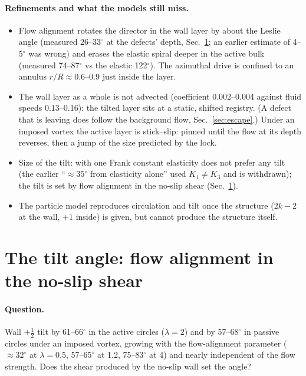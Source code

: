 \documentclass[11pt,a4paper]{article}
\newcommand{\half}{\tfrac12}
\begin{document}
\paragraph{Refinements and what the models still miss.}
\begin{itemize}
  \item Flow alignment rotates the director in the wall layer by about the Leslie angle (measured 26--33$^\circ$ at the defects' depth, Sec.~\ref{sec:tilt}; an earlier estimate of 4--5$^\circ$
        was wrong) and erases the elastic spiral deeper in the active bulk (measured 74--87$^\circ$ vs the elastic 122$^\circ$).
        The azimuthal drive is confined to an annulus $r/R\approx0.6$--0.9 just inside the layer.
  \item The wall layer as a whole is not advected (coefficient 0.002--0.004 against fluid speeds 0.13--0.16): the tilted layer sits at a static, shifted registry. (A defect that is leaving does follow the background flow, Sec.~\ref{sec:escape}.)
        Under an imposed vortex the active layer is stick--slip: pinned until the flow at its depth reverses, then a jump of the size predicted by the lock.
  \item Size of the tilt: with one Frank constant elasticity does not prefer any tilt (the earlier ``$\approx35^\circ$ from elasticity alone'' used $K_1\neq K_3$ and is withdrawn); the
        tilt is set by flow alignment in the no-slip shear (Sec.~\ref{sec:tilt}).
  \item The particle model reproduces circulation and tilt once the structure ($2k-2$ at the wall, $+1$ inside) is given, but cannot produce the structure itself.
\end{itemize}

\section{The tilt angle: flow alignment in the no-slip shear}\label{sec:tilt}
\paragraph{Question.} Wall $+\half$ tilt by 61--66$^\circ$ in the active circles ($\lambda=2$) and by 57--68$^\circ$ in passive circles under an imposed vortex, growing with the
flow-alignment parameter ($\approx32^\circ$ at $\lambda=0.5$, 57--65$^\circ$ at 1.2, 75--83$^\circ$ at 4) and nearly independent of the flow strength.
Does the shear produced by the no-slip wall set the angle?
\end{document}
